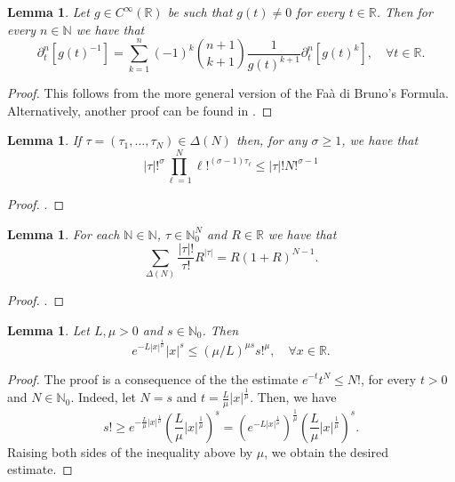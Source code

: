 \documentclass[11pt,reqno]{amsart}
\numberwithin{equation}{section}
\newtheorem{lemma}[theorem]{Lemma}
\theoremstyle{definition}
\theoremstyle{definition}
\newcommand{\R}{\mathbb{R}}
\newcommand{\N}{\mathbb{N}}
\begin{document}
\begin{lemma}\label{derivative-reciprocal}
    Let $g\in C^{\infty}(\R)$ be such that $g(t)\neq 0$ for every $t\in\R$. Then for every $n\in\N$ we have that
    \begin{equation*}
        \partial_t^n [g(t)^{-1}]=\sum_{k=1}^n(-1)^k\binom{n+1}{k+1}\frac{1}{g(t)^{k+1}}\partial_t^n[g(t)^k],\quad \forall t\in\R.
    \end{equation*}
\end{lemma}
\begin{proof}
	This follows from the more general version of the Faà di Bruno's Formula. Alternatively, another proof can be found in  \cite{Leslie01101991}.
\end{proof}


\begin{lemma}\label{lemma_algebraic_1}
    If $\tau=(\tau_1,\dots,\tau_N)\in\Delta(N)$ then, for any $\sigma\geq 1$, we have that
    \begin{equation*}
        |\tau|!^{\sigma}\prod_{\ell=1}^{N}\ell!^{(\sigma-1)\tau_{\ell}}\leq |\tau|!N!^{\sigma-1}
    \end{equation*}
\end{lemma}
\begin{proof}
    \cite[Lemma 2.1]{BDG2018}.
\end{proof}


\begin{lemma}\label{lemma_algebraic_2}
    For each $\N\in\N$, $\tau\in\N_0^N$ and $R\in\R$ we have that
    \begin{equation*}
        \sum_{\Delta(N)}\frac{|\tau|!}{\tau!}R^{|\tau|}=R(1+R)^{N-1}.
    \end{equation*}
\end{lemma}
\begin{proof}
	\cite[Lemma 1.4.1]{krantz}.
\end{proof}


\begin{lemma}\label{lemma-exponential}
Let $L,\mu>0$ and $s\in\N_0$. Then
\begin{equation*}
     e^{-L|x|^{\frac{1}{\mu}}}|x|^{s}\leq (\mu/L)^{\mu s}s!^{\mu},\quad\forall x\in\R.
\end{equation*}
\end{lemma}
\begin{proof}
    The proof is a consequence of the the estimate $e^{-t}t^N\leq N!$, for every $t>0$ and $N\in\mathbb{N}_0$. Indeed, let $N=s$ and $t=\frac{L}{\mu}|x|^{\frac{1}{\mu}}$. Then, we have
    \[s!\geq e^{-\frac{L}{\mu}|x|^{\frac{1}{\mu}}}\left(\frac{L}{\mu}|x|^{\frac{1}{\mu}}\right)^{s} = \left(e^{-L|x|^{\frac{1}{\mu}}}\right)^{\frac{1}{\mu}}\left(\frac{L}{\mu}|x|^{\frac{1}{\mu}}\right)^{s}. \]
    Raising both sides of the inequality above by $\mu$, we obtain the desired estimate.
\end{proof}
\end{document}
